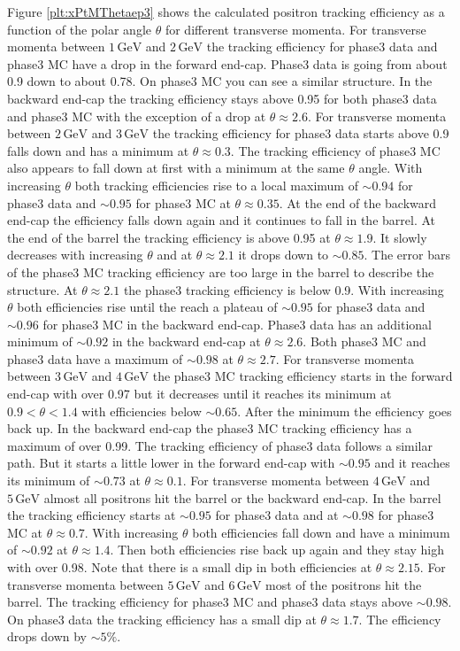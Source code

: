 \documentclass[a4paper,11pt,twosided,final,german,openbib,pdftex,listof=totoc,bibliography=totoc]{scrbook}
\begin{document}
Figure \ref{plt:xPtMThetaep3} shows the calculated positron tracking efficiency as a function of the polar angle $\theta$ for different transverse momenta.
For transverse momenta between $1\,\textrm{GeV}$ and $2\,\textrm{GeV}$ the tracking efficiency for phase3 data and phase3 MC have a drop in the forward end-cap. Phase3 data is going from about 0.9 down to about 0.78. On phase3 MC you can see a similar structure. In the backward end-cap the tracking efficiency stays above 0.95 for both phase3 data and phase3 MC with the exception of a drop at $\theta \approx 2.6$.
For transverse momenta between $2\,\textrm{GeV}$ and $3\,\textrm{GeV}$ the tracking efficiency for phase3 data starts above 0.9 falls down and has a minimum at $\theta \approx 0.3$. The tracking efficiency of phase3 MC also appears to fall down at first with a minimum at the same $\theta$ angle. With increasing $\theta$ both tracking efficiencies rise to a local maximum of $\sim 0.94$ for phase3 data and $\sim 0.95$ for phase3 MC at $\theta \approx 0.35$. At the end of the backward end-cap the efficiency falls down again and it continues to fall in the barrel. At the end of the barrel the tracking efficiency is above 0.95 at $\theta \approx 1.9$. It slowly decreases with increasing $\theta$ and at $\theta \approx 2.1$ it drops down to $\sim 0.85$. The error bars of the phase3 MC tracking efficiency are too large in the barrel to describe the structure. At $\theta \approx 2.1$ the phase3 tracking efficiency is below 0.9. With increasing $\theta$ both efficiencies rise until the reach a plateau of $\sim 0.95$ for phase3 data and $\sim 0.96$ for phase3 MC in the backward end-cap. Phase3 data has an additional minimum of $\sim 0.92$ in the backward end-cap at $\theta \approx 2.6$. Both phase3 MC and phase3 data have a maximum of $\sim 0.98$ at $\theta \approx 2.7$.
For transverse momenta between $3\,\textrm{GeV}$ and $4\,\textrm{GeV}$ the phase3 MC tracking efficiency starts in the forward end-cap with over 0.97 but it decreases until it reaches its minimum at $0.9 < \theta < 1.4$ with efficiencies below $\sim 0.65$. After the minimum the efficiency goes back up. In the backward end-cap the phase3 MC tracking efficiency has a maximum of over 0.99. The tracking efficiency of phase3 data follows a similar path. But it starts a little lower in the forward end-cap with $\sim 0.95$ and it reaches its minimum of $\sim 0.73$ at $\theta \approx 0.1$.
For transverse momenta between $4\,\textrm{GeV}$ and $5\,\textrm{GeV}$ almost all positrons hit the barrel or the backward end-cap. In the barrel the tracking efficiency starts at $\sim 0.95$ for phase3 data and at $\sim 0.98$ for phase3 MC at $\theta \approx 0.7$. With increasing $\theta$ both efficiencies fall down and have a minimum of $\sim 0.92$ at $\theta \approx 1.4$. Then both efficiencies rise back up again and they stay high with over 0.98. Note that there is a small dip in both efficiencies at $\theta \approx 2.15$.
For transverse momenta between $5\,\textrm{GeV}$ and $6\,\textrm{GeV}$ most of the positrons hit the barrel. The tracking efficiency for phase3 MC and phase3 data stays above $\sim 0.98$. On phase3 data the tracking efficiency has a small dip at $\theta \approx 1.7$. The efficiency drops down by $\sim 5\%$.
\end{document}
